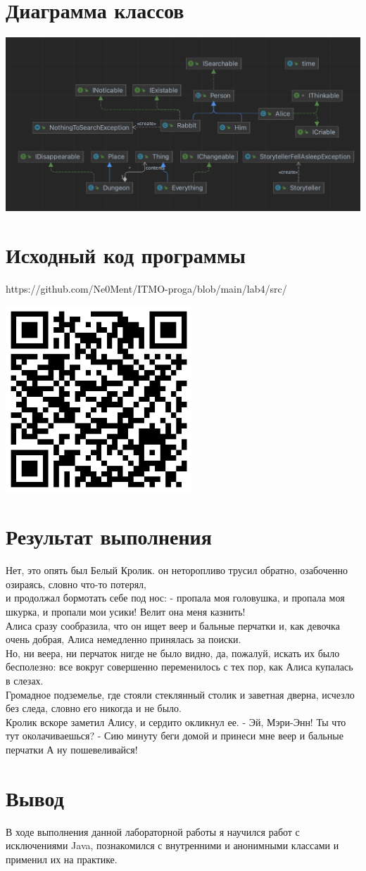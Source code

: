 \documentclass[12pt,onecolumn]{article}
\begin{document}
\section{Диаграмма классов}
\includegraphics[width=\columnwidth]{imgs/lab4_diagram.png}

\section{Исходный код программы}
https://github.com/Ne0Ment/ITMO-proga/blob/main/lab4/src/
\begin{center}
  \includegraphics[width=7cm]{imgs/lab4_qr.png}
\end{center}
\section{Результат выполнения}
Нет, это опять был Белый Кролик. он неторопливо трусил обратно, озабоченно озираясь, словно что-то потерял, \\
и продолжал бормотать себе под нос: - пропала моя головушка, и пропала моя шкурка, и пропали мои усики! Велит она меня казнить! \\
Алиса сразу сообразила, что он ищет веер и бальные перчатки и, как девочка очень добрая, Алиса немедленно принялась за поиски. \\
Но, ни веера, ни перчаток нигде не было видно, да, пожалуй, искать их было бесполезно: все вокруг совершенно переменилось с тех пор, как Алиса купалась в слезах. \\
Громадное подземелье, где стояли стеклянный столик и заветная дверна, исчезло без следа, словно его никогда и не было. \\
Кролик вскоре заметил Алису, и сердито окликнул ее. - Эй, Мэри-Энн! Ты что тут околачиваешься? - Сию минуту беги домой и принеси мне веер и бальные перчатки А ну пошевеливайся! \\
\section{Вывод}
В ходе выполнения данной лабораторной работы я научился работ с исключениями Java, познакомился с внутренними и анонимными классами и применил их на практике. \\
\end{document}
